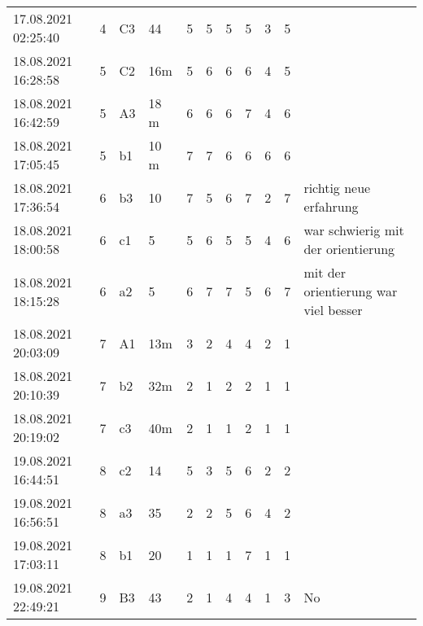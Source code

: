 \begin{landscape}
\begin{table}[]
\begin{tabular}{lcllccccccp{7cm}}
17.08.2021 02:25:40 & 4         & C3                & 44        & 5  & 5  & 5  & 5  & 3  & 5  &                                                           \\
18.08.2021 16:28:58 & 5         & C2                & 16m       & 5  & 6  & 6  & 6  & 4  & 5  &                                                           \\
18.08.2021 16:42:59 & 5         & A3                & 18 m      & 6  & 6  & 6  & 7  & 4  & 6  &                                                           \\
18.08.2021 17:05:45 & 5         & b1                & 10 m      & 7  & 7  & 6  & 6  & 6  & 6  &                                                           \\
18.08.2021 17:36:54 & 6         & b3                & 10        & 7  & 5  & 6  & 7  & 2  & 7  & richtig neue erfahrung                                    \\
18.08.2021 18:00:58 & 6         & c1                & 5         & 5  & 6  & 5  & 5  & 4  & 6  & war schwierig mit der orientierung                        \\
18.08.2021 18:15:28 & 6         & a2                & 5         & 6  & 7  & 7  & 5  & 6  & 7  & mit der orientierung war viel besser                      \\
18.08.2021 20:03:09 & 7         & A1                & 13m       & 3  & 2  & 4  & 4  & 2  & 1  &                                                           \\
18.08.2021 20:10:39 & 7         & b2                & 32m       & 2  & 1  & 2  & 2  & 1  & 1  &                                                           \\
18.08.2021 20:19:02 & 7         & c3                & 40m       & 2  & 1  & 1  & 2  & 1  & 1  &                                                           \\
19.08.2021 16:44:51 & 8         & c2                & 14        & 5  & 3  & 5  & 6  & 2  & 2  &                                                           \\
19.08.2021 16:56:51 & 8         & a3                & 35        & 2  & 2  & 5  & 6  & 4  & 2  &                                                           \\
19.08.2021 17:03:11 & 8         & b1                & 20        & 1  & 1  & 1  & 7  & 1  & 1  &                                                           \\
19.08.2021 22:49:21 & 9         & B3                & 43        & 2  & 1  & 4  & 4  & 1  & 3  & No                                                        \\

\end{tabular}
\end{table}
\end{landscape}
